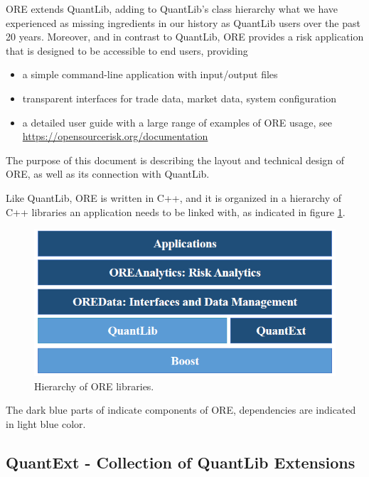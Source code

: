 \documentclass[12pt, a4paper]{report}
\begin{document}
ORE extends QuantLib, adding to QuantLib's class hierarchy what we have experienced as missing ingredients in our history as QuantLib users over the past 20 years.
Moreover, and in contrast to QuantLib, ORE provides a risk application that is designed to be accessible to end users, providing

\begin{itemize}
\item a simple command-line application with input/output files
\item transparent interfaces for trade data, market data, system configuration
\item a detailed user guide with a large range of examples of ORE usage, see \url{https://opensourcerisk.org/documentation}
\end{itemize}

The purpose of this document is describing the layout and technical design of ORE, as well as its connection with QuantLib. 

Like QuantLib, ORE is written in C++, and it is organized in a hierarchy of C++ libraries an application needs to be linked with, as indicated in figure \ref{fig_Hierarchy}.

\begin{figure}[h]
\begin{center}
\includegraphics[scale=0.6]{data/Overview}
\end{center}
\caption{Hierarchy of ORE libraries. }
\label{fig_Hierarchy}
\end{figure}

The dark blue parts of indicate components of ORE, dependencies are indicated in light blue color.

\subsection*{QuantExt - Collection of QuantLib Extensions}
\end{document}
